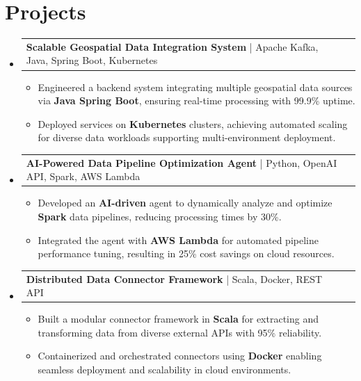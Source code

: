 \documentclass[letterpaper,11pt]{article}
\makeatletter
\newcommand{\resumeItem}[1]{
  \item\footnotesize{
    {#1 \vspace{-2pt}}
  }
}
\newcommand{\resumeProjectHeading}[2]{
    \item
    \begin{tabular*}{1.001\textwidth}{l@{\extracolsep{\fill}}r}
      \small#1 & \textbf{\small #2}\\
    \end{tabular*}\vspace{-7pt}
}
\newcommand{\resumeSubHeadingListStart}{\begin{itemize}[leftmargin=0pt, label={}]}
\newcommand{\resumeSubHeadingListEnd}{\end{itemize}}
\newcommand{\resumeItemListStart}{\begin{itemize}[leftmargin=*]}
\newcommand{\resumeItemListEnd}{\end{itemize}\vspace{-5pt}}
\makeatother
\begin{document}
\section{Projects}
    \vspace{-5pt}
    \resumeSubHeadingListStart
      \resumeProjectHeading
          {\textbf{Scalable Geospatial Data Integration System} | Apache Kafka, Java, Spring Boot, Kubernetes}{}
          \resumeItemListStart
              \resumeItem{Engineered a backend system integrating multiple geospatial data sources via \textbf{Java Spring Boot}, ensuring real-time processing with 99.9\% uptime.}
              \resumeItem{Deployed services on \textbf{Kubernetes} clusters, achieving automated scaling for diverse data workloads supporting multi-environment deployment.}
          \resumeItemListEnd
          \vspace{-12pt}
      \resumeProjectHeading
          {\textbf{AI-Powered Data Pipeline Optimization Agent} | Python, OpenAI API, Spark, AWS Lambda}{}
          \resumeItemListStart
              \resumeItem{Developed an \textbf{AI-driven} agent to dynamically analyze and optimize \textbf{Spark} data pipelines, reducing processing times by 30\%.}
              \resumeItem{Integrated the agent with \textbf{AWS Lambda} for automated pipeline performance tuning, resulting in 25\% cost savings on cloud resources.}
          \resumeItemListEnd
          \vspace{-12pt}
      \resumeProjectHeading
          {\textbf{Distributed Data Connector Framework} | Scala, Docker, REST API}{}
          \resumeItemListStart
              \resumeItem{Built a modular connector framework in \textbf{Scala} for extracting and transforming data from diverse external APIs with 95\% reliability.}
              \resumeItem{Containerized and orchestrated connectors using \textbf{Docker} enabling seamless deployment and scalability in cloud environments.}
          \resumeItemListEnd 
    \resumeSubHeadingListEnd
\end{document}
